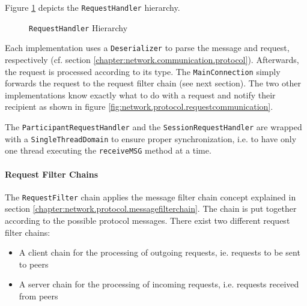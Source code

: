 Figure \ref{fig:network.protocol.requesthandler.uml} depicts the \texttt{RequestHandler} hierarchy.

\begin{figure}[H]
 \centering
 \caption{\texttt{RequestHandler} Hierarchy}
 \label{fig:network.protocol.requesthandler.uml}
\end{figure}

Each implementation uses a \texttt{Deserializer} to parse the message and request, respectively (cf. section \ref{chapter:network.communication.protocol}). Afterwards, the request is processed according to its type. The \texttt{MainConnection} simply forwards the request to the request filter chain (see next section). The two other implementations know exactly what to do with a request and notify their recipient as shown in figure \ref{fig:network.protocol.requestcommunication}.

The \texttt{ParticipantRequestHandler} and the \texttt{SessionRequestHandler} are wrapped with a \texttt{SingleThreadDomain} to ensure proper synchronization, i.e. to have only one thread executing the \texttt{receiveMSG} method at a time.


\paragraph{Request Filter Chains}
\label{chapter:networkfilterchains}

The \texttt{RequestFilter} chain applies the message filter chain concept explained in section \ref{chapter:network.protocol.messagefilterchain}. The chain is put together according to the possible protocol messages. There exist two different request filter chains: 

\begin{itemize}
 \item A client chain for the processing of outgoing requests, ie. requests to be sent to peers
 \item A server chain for the processing of incoming requests, i.e. requests received from peers
\end{itemize}


